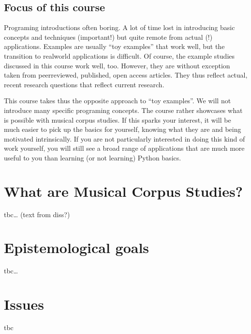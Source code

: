 \documentclass[letterpaper,10pt,english]{sphinxmanual}
\begin{document}
\subsection{Focus of this course}
\label{\detokenize{2_introduction:focus-of-this-course}}
Programing introductions often boring.
A lot of time lost in introducing basic concepts and techniques (important!)
but quite remote from actual (!) applications. Examples are usually “toy examples”
that work well, but the transition to real\sphinxhyphen{}world applications is difficult.
Of course, the example studies discussed in this course work well, too.
However, they are without exception taken from peer\sphinxhyphen{}reviewed, published, open access articles.
They thus reflect actual, recent research questions that reflect current research.

This course takes thus the opposite approach to “toy examples”. We will not introduce many specific
programing concepts. The course rather showcases what is possible with musical corpus studies.
If this sparks your interest, it will be much easier to pick up the basics for yourself,
knowing what they are  and being motivated intrinsically.
If you are not particularly interested in doing this kind of work yourself,
you will still see a broad range of applications that are much more useful to you than
learning (or not learning) Python basics.


\section{What are Musical Corpus Studies?}
\label{\detokenize{2_introduction:what-are-musical-corpus-studies}}
tbc… (text from diss?)


\section{Epistemological goals}
\label{\detokenize{2_introduction:epistemological-goals}}
tbc…


\section{Issues}
\label{\detokenize{2_introduction:issues}}
tbc 
\end{document}
